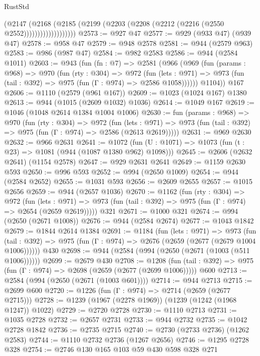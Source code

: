 \begin{lexlean}{RustStd}
\begin{coremodule}
{\begin{coremodule}
{{{{{{{{{{                        (@2147
                          (@2168
                            (@2185
                              (@2199 (@2203 (@2208 (@2212 (@2216 (@2550 @2552)))))))))))))))))))
@2573 := @927 @47
@2577 := @929 (@933 @47) (@939 @47)
@2578 := @958 @47
@2579 := @948 @2578
@2581 := @944 (@2579 @963)
@2583 := @986 (@987 @47)
@2584 := @982 @2583
@2586 := @944 (@2584 @1011)
@2603 := @943
    (fun (fn : @7) =>
    @2581
      (@966
        (@969
          (fun (params : @968) =>
          @970
            (fun (rty : @304) =>
            @972
              (fun (lets : @971) =>
              @973 (fun (tail : @392) => @975 (fun (Γ : @974) => @2586 @1058))))))
        @1104))
    @167
@2606 := @1110 (@2579 (@961 @167))
@2609 := @1023 (@1024 @167) @1380
@2613 := @944 (@1015 (@2609 @1032) @1036)
@2614 := @1049 @167
@2619 := @1046 (@1048 @2614 @1384 @1004 @1006)
@2630 := fun (params : @968) =>
  @970
    (fun (rty : @304) =>
    @972
      (fun (lets : @971) =>
      @973 (fun (tail : @392) => @975 (fun (Γ : @974) => @2586 (@2613 @2619)))))
@2631 := @969 @2630
@2632 := @966 @2631
@2641 := @1072 (fun (U : @1071) => @1073 (fun (t : @23) => @1081 (@944 (@1087 @1380 @962) @1098)))
@2645 := @2606 (@2632 @2641) (@1154 @2578)
@2647 := @929 @2631 @2641
@2649 := @1159 @2630 @593
@2650 := @996 @593
@2652 := @994 (@2650 @1009)
@2654 := @944 (@2584 @2652)
@2655 := @1031 @593
@2656 := @2609 @2655
@2657 := @1015 @2656
@2659 := @944 (@2657 @1036)
@2670 := @1162
    (fun (rty : @304) =>
    @972
      (fun (lets : @971) =>
      @973 (fun (tail : @392) => @975 (fun (Γ : @974) => @2654 (@2659 @2619)))))
    @321
@2671 := @1000 @321
@2674 := @994 (@2650 (@2671 @1008))
@2676 := @944 (@2584 @2674)
@2677 := @1043 @1842
@2679 := @1844 @2614 @1384
@2691 := @1184
    (fun (lets : @971) =>
    @973 (fun (tail : @392) => @975 (fun (Γ : @974) => @2676 (@2659 (@2677 (@2679 @1004 @1006))))))
    @430
@2698 := @944 (@2584 (@994 (@2650 (@2671 (@1003 (@511 @1006))))))
@2699 := @2679 @430
@2708 := @1208
    (fun (tail : @392) => @975 (fun (Γ : @974) => @2698 (@2659 (@2677 (@2699 @1006)))))
    @600
@2713 := @2584 (@994 (@2650 (@2671 (@1003 @601))))
@2714 := @944 @2713
@2715 := @2699 @600
@2720 := @1226 (fun (Γ : @974) => @2714 (@2659 (@2677 @2715)))
@2728 := @1239 (@1967 (@2278 @1969)) (@1239 (@1242 (@1968 @1247)) @1022)
@2729 := @2720 @2728
@2730 := @1110 @2713
@2731 := @1035 @2728
@2732 := @2657 @2731
@2733 := @944 @2732
@2735 := @1042 @2728 @1842
@2736 := @2735 @2715
@2740 := @2730 (@2733 @2736) (@1262 @2583)
@2744 := @1110 @2732 @2736 (@1267 @2656)
@2746 := @1295 @2728 @328
@2754 := @2746 @130 @165 @103 @59 @430 @598 @328 @271
}}}}}}}}}}
\end{coremodule}}
\end{coremodule}
\end{lexlean}
